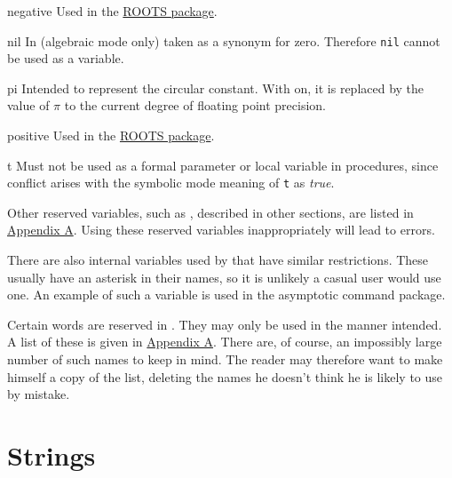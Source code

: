 \begin{list}{}
\item[negative] Used in the \hyperlink{package:ROOTS}{ROOTS package}.

\item[nil] In {\REDUCE} (algebraic mode only)
taken as a synonym for zero.  Therefore \texttt{nil} cannot be used as a
variable.

\item[pi] Intended to represent the circular%
%
constant.  With  on, it is replaced by the value of $\pi$ to
the current degree of floating point precision.

\item[positive] Used in the \hyperlink{package:ROOTS}{ROOTS package}.

\item[t] Must not be used as a formal%
%
parameter or local variable in procedures, since conflict arises with the
symbolic mode meaning of \texttt{t} as \emph{true}.
\end{list}

Other reserved variables, such as
\hyperlink{reserved:LOW_POW}{}, described in other
sections, are listed in \hyperlink{sec:appendixa}{Appendix A}.  Using
these reserved variables inappropriately will
lead to errors.

There are also internal variables used by {\REDUCE} that have similar
restrictions. These usually have an asterisk in their names, so it is
unlikely a casual user would use one. An example of such a variable is
 used in the asymptotic command package.

Certain words are reserved in {\REDUCE}. They may only be used in the manner
intended. A list of these is given in \hyperlink{sec:appendixa}{Appendix A}.
There are, of course, an impossibly large number of such names to keep in
mind. The reader may therefore want to make himself a copy of the list,
deleting the names he doesn't think he is likely to use by mistake.

\hypertarget{strings}{\section{Strings}}

